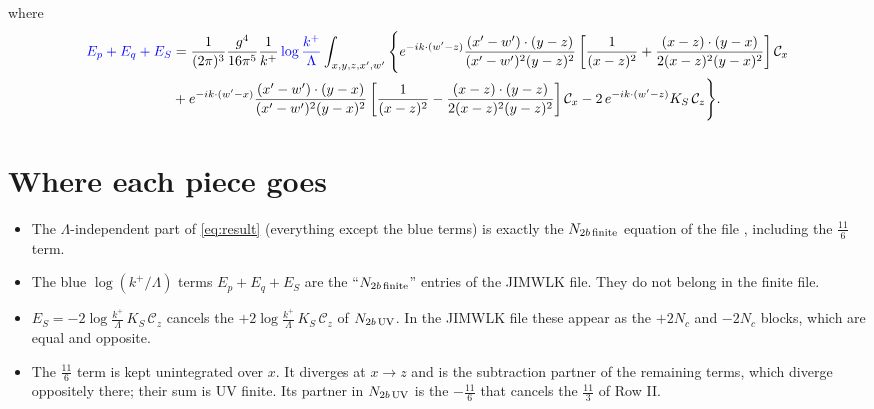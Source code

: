 \documentclass[10pt]{article}
\numberwithin{equation}{section}
\begin{document}
where
\begin{align}
{\color{blue}E_{p}+E_{q}+E_{S}}&=\frac{1}{(2\pi)^{3}}\frac{g^{4}}{16\pi^{5}}\frac{1}{k^{+}}\,{\color{blue}\log\frac{k^{+}}{\Lambda}}\int_{x,y,z,x',w'}\Bigg\{
e^{-ik\cdot(w'-z)}\frac{(x'-w')\cdot(y-z)}{(x'-w')^{2}(y-z)^{2}}\left[\frac{1}{(x-z)^{2}}+\frac{(x-z)\cdot(y-x)}{2(x-z)^{2}(y-x)^{2}}\right]\mathcal{C}_{x}\notag\\
&+e^{-ik\cdot(w'-x)}\frac{(x'-w')\cdot(y-x)}{(x'-w')^{2}(y-x)^{2}}\left[\frac{1}{(x-z)^{2}}-\frac{(x-z)\cdot(y-z)}{2(x-z)^{2}(y-z)^{2}}\right]\mathcal{C}_{x}
-2\,e^{-ik\cdot(w'-z)}K_{S}\,\mathcal{C}_{z}\Bigg\}.
\end{align}

\section{Where each piece goes}
\begin{itemize}
\item The $\Lambda$-independent part of \eqref{eq:result} (everything except the blue terms) is exactly the $N_{2b\,\rm finite}$ equation of the file , including the $\frac{11}{6}$ term.
\item The blue $\log(k^{+}/\Lambda)$ terms $E_{p}+E_{q}+E_{S}$ are the ``$N_{2b\,\rm finite}$'' entries of the JIMWLK file. They do not belong in the finite file.
\item $E_{S}=-2\log\frac{k^{+}}{\Lambda}\,K_{S}\,\mathcal{C}_{z}$ cancels the $+2\log\frac{k^{+}}{\Lambda}\,K_{S}\,\mathcal{C}_{z}$ of $N_{2b\,\rm UV}$. In the JIMWLK file these appear as the $+2N_{c}$ and $-2N_{c}$ blocks, which are equal and opposite.
\item The $\frac{11}{6}$ term is kept unintegrated over $x$. It diverges at $x\to z$ and is the subtraction partner of the remaining terms, which diverge oppositely there; their sum is UV finite. Its partner in $N_{2b\,\rm UV}$ is the $-\frac{11}{6}$ that cancels the $\frac{11}{3}$ of Row II.
\end{itemize}
\end{document}
